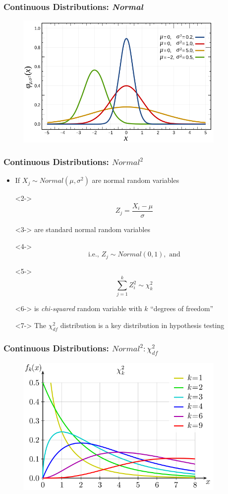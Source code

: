 \documentclass[xcolor={dvipsnames}]{beamer}
\begin{document}
\frame
{
 \frametitle{Continuous Distributions: \emph{Normal} }
 
\begin{figure}
\centering
\includegraphics[width=4in]{stuff/normal.png}
\end{figure}
}

\frame
{
 \frametitle{Continuous Distributions: $Normal^2$}
 
\begin{itemize}
\item If $X_j \sim Normal\left(\mu,\sigma^2\right)$ are normal random variables
\item[]<2->
$$Z_j = \frac{X_i-\mu}{\sigma}$$
\item[]<3-> are standard normal random variables 
\item[]<4-> $$\text{i.e., } Z_j \sim Normal\left(0,1\right), \text{ and}$$ 
\item[]<5->
$$ \sum_{j=1}^k Z_i^2 \sim \chi^2_k$$
\item[]<6-> is \emph{chi-squared} random variable with $k$ ``degrees of freedom'' 
\item[]
\item[]<7-> The $\chi^2_{df}$ distribution is a key distribution in hypothesis testing
\end{itemize} 
 }


\frame
{
 \frametitle{Continuous Distributions: $Normal^2: \chi^2_{df}$ }
 
\begin{figure}
\centering
\includegraphics[width=4in]{stuff/chi2.png}
\end{figure}
}
\end{document}
